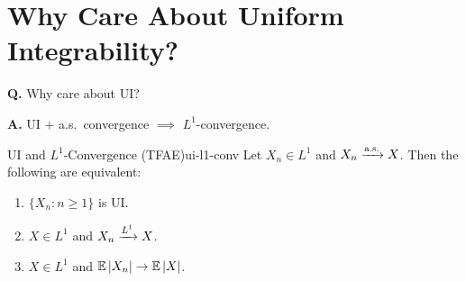 \section{Why Care About Uniform Integrability?}

\textbf{Q.} Why care about UI?

\textbf{A.} UI $+$ a.s.\ convergence $\implies$ $L^1$-convergence.

\begin{theorem}{UI and $L^1$-Convergence (TFAE)}{ui-l1-conv}
    Let $X_n \in L^1$ and $X_n \xrightarrow{\text{a.s.}} X$. Then the following are equivalent:
    \begin{enumerate}[label=(\roman*)]
        \item $\{X_n : n \geq 1\}$ is UI.
        \item $X \in L^1$ and $X_n \xrightarrow{L^{1}} X$.
        \item $X \in L^1$ and $\mathbb{E}\left|X_n\right| \to \mathbb{E}\left|X\right|$.
    \end{enumerate}
\end{theorem}

